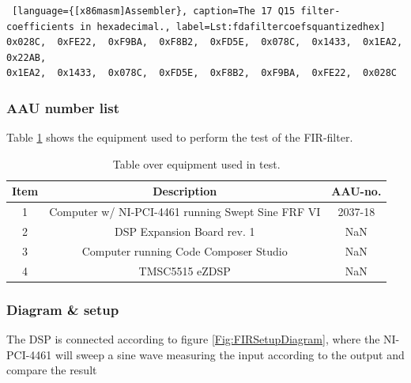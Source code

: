 \begin{lstlisting} [language={[x86masm]Assembler}, caption=The 17 Q15 filter-coefficients in hexadecimal., label=Lst:fdafiltercoefsquantizedhex]
0x028C,  0xFE22,  0xF9BA,  0xF8B2,  0xFD5E,  0x078C,  0x1433,  0x1EA2,  0x22AB,  
0x1EA2,  0x1433,  0x078C,  0xFD5E,  0xF8B2,  0xF9BA,  0xFE22,  0x028C
\end{lstlisting}



\subsubsection{AAU number list}
Table \ref{tab:UsedEquipmentListningFIRTest} shows the equipment used to perform the test of the FIR-filter.
\begin{table}[H]
	\centering
	\begin{tabular}{ c c c } \toprule
	{Item}	& {Description} 								& {AAU-no}. 	\\ \bottomrule 
	1	&	Computer w/ NI-PCI-4461 running Swept Sine FRF VI	& 2037-18			\\
	2	&	DSP Expansion Board rev. 1 						& NaN			\\
	3	&	Computer running Code Composer Studio			& NaN		\\
	4	&	TMSC5515 eZDSP 									& NaN			\\
	\bottomrule
	\end{tabular}
	\caption{Table over equipment used in test.}
	\label{tab:UsedEquipmentListningFIRTest}
\end{table}

\subsubsection{Diagram \& setup}

The DSP is connected according to figure \ref{Fig:FIRSetupDiagram}, where the NI-PCI-4461 will sweep a sine wave measuring the input according to the output and compare the result


